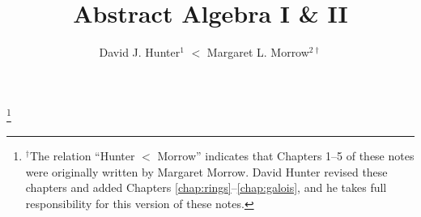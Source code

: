
%
\usepackage{graphicx}
\usepackage{enumitem}

\usepackage{thmtools}
\theoremstyle{definition}

\usepackage{amscd} %
\usepackage{tikz} %
\usetikzlibrary{shapes.misc}


\newcommand*\notesymbol[1]{\tikz{
            \node[shape=rounded rectangle,fill=yellow!25,draw,inner xsep=2pt, inner ysep=2pt] (char) {#1};}}
\renewcommand{\makeenmark}{\notesymbol{\scriptsize\theenmark}\hspace{3pt}}

\newcommand{\ZZ}{\mathbb{Z}}
\newcommand{\NN}{\mathbb{N}}
\newcommand{\QQ}{\mathbb{Q}}
\newcommand{\RR}{\mathbb{R}}
\newcommand{\CC}{\mathbb{C}}
\newcommand{\FF}{\mathbb{F}}
\DeclareMathOperator{\stab}{stab}
\DeclareMathOperator{\Irr}{Irr}
\DeclareMathOperator{\Gal}{Gal}
\DeclareMathOperator{\Ker}{Ker}

%
\InstructorVersion
%
\newcommand\blfootnote[1]{%
  \begingroup
  \renewcommand\thefootnote{}\footnote{#1}%
  \addtocounter{footnote}{-1}%
  \endgroup
}


\large
\frontmatter
\title{Abstract Algebra I \& II}
\author{David J. Hunter$^1$ $<$ Margaret L. Morrow$^{2\dagger}$}
\blfootnote{$^\dagger$The relation ``Hunter $<$ Morrow'' indicates that Chapters 1--5 of these notes were originally written by Margaret Morrow. David Hunter revised these chapters and added Chapters \ref{chap:rings}--\ref{chap:galois}, and he takes full responsibility for this version of these notes.}
\maketitle

